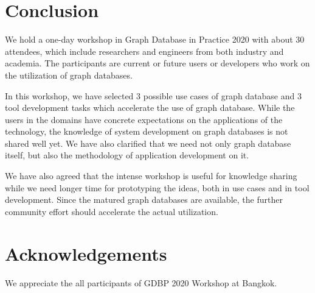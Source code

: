 \documentclass[runningheads]{llncs}
\begin{document}

\section{Conclusion}
We hold a one-day workshop in Graph Database in Practice 2020 with about 30 attendees, which include researchers and engineers from both industry and academia. The participants are current or future users or developers who work on the utilization of graph databases.

In this workshop, we have selected 3 possible use cases of graph database and 3 tool development tasks which accelerate the use of graph database. While the users in the domains have concrete expectations on the applications of the technology, the knowledge of system development on graph databases is not shared well yet. We have also clarified that we need not only graph database itself, but also the methodology of application development on it.

We have also agreed that the intense workshop is useful for knowledge sharing while we need longer time for prototyping the ideas, both in use cases and in tool development. Since the matured graph databases are available, the further community effort should accelerate the actual utilization.



\section*{Acknowledgements}
We appreciate the all participants of GDBP 2020 Workshop at Bangkok.
\end{document}
